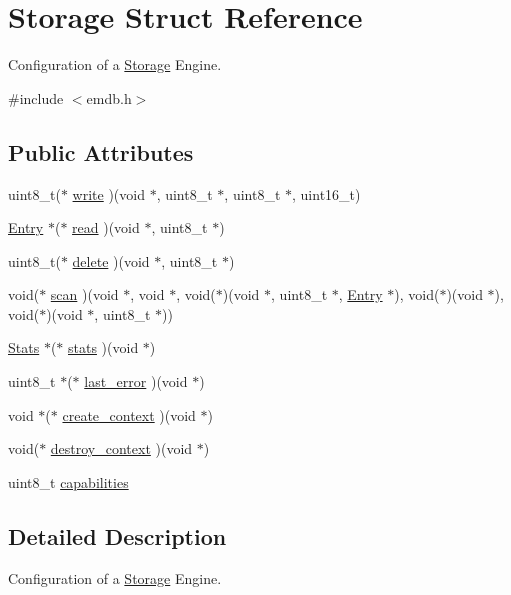 \hypertarget{struct_storage}{}\section{Storage Struct Reference}
\label{struct_storage}


Configuration of a \hyperlink{struct_storage}{Storage} Engine.  




{\ttfamily \#include $<$emdb.\+h$>$}

\subsection*{Public Attributes}
\begin{DoxyCompactItemize}
\item 
uint8\+\_\+t($\ast$ \hyperlink{struct_storage_a1024d08a7a0b30fb2d9a492a672d9f05}{write} )(void $\ast$, uint8\+\_\+t $\ast$, uint8\+\_\+t $\ast$, uint16\+\_\+t)
\item 
\hyperlink{struct_entry}{Entry} $\ast$($\ast$ \hyperlink{struct_storage_a06f9fdcde49a3bbae624b5f673d5798a}{read} )(void $\ast$, uint8\+\_\+t $\ast$)
\item 
uint8\+\_\+t($\ast$ \hyperlink{struct_storage_a683a58e3ef6da9f3a95fdf4a94f80dc3}{delete} )(void $\ast$, uint8\+\_\+t $\ast$)
\item 
void($\ast$ \hyperlink{struct_storage_a5e24b45fef757acae34cca3bb8464935}{scan} )(void $\ast$, void $\ast$, void($\ast$)(void $\ast$, uint8\+\_\+t $\ast$, \hyperlink{struct_entry}{Entry} $\ast$), void($\ast$)(void $\ast$), void($\ast$)(void $\ast$, uint8\+\_\+t $\ast$))
\item 
\hyperlink{struct_stats}{Stats} $\ast$($\ast$ \hyperlink{struct_storage_a6642751e068c1e64f8b65703a8bc51a0}{stats} )(void $\ast$)
\item 
uint8\+\_\+t $\ast$($\ast$ \hyperlink{struct_storage_a8d06a225bc4d31d734cab75608fa3cf3}{last\+\_\+error} )(void $\ast$)
\item 
void $\ast$($\ast$ \hyperlink{struct_storage_a96d6e9b9bfd5b4943eb9660ca2293447}{create\+\_\+context} )(void $\ast$)
\item 
void($\ast$ \hyperlink{struct_storage_af425b1971a9fcfed315e6aec547df8da}{destroy\+\_\+context} )(void $\ast$)
\item 
uint8\+\_\+t \hyperlink{struct_storage_a7b4013010f2549531d066e6d701c69d9}{capabilities}
\end{DoxyCompactItemize}


\subsection{Detailed Description}
Configuration of a \hyperlink{struct_storage}{Storage} Engine. 

